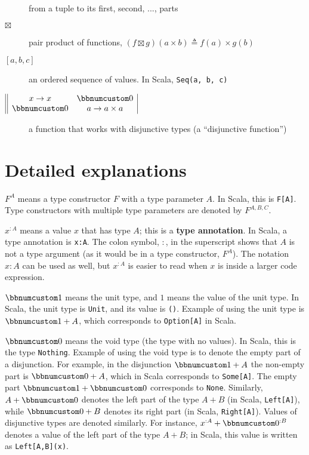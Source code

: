 \begin{description}
from a tuple to its first, second, ..., parts
\item [{$\boxtimes$}] pair product of functions, $(f\boxtimes g)(a\times b)\triangleq f(a)\times g(b)$
\item [{$\left[a,b,c\right]$}] an ordered sequence of values. In Scala,
\lstinline!Seq(a, b, c)!
\item [{$\begin{array}{||cc|}
x\rightarrow x & \bbnum 0\\
\bbnum 0 & a\rightarrow a\times a
\end{array}$}] a function that works with disjunctive types (a \textsf{``}disjunctive
function\textsf{''})
\end{description}

\section{Detailed explanations}

$F^{A}$ means a type constructor $F$ with a type parameter $A$.
In Scala, this is \lstinline!F[A]!. Type constructors with multiple
type parameters are denoted by $F^{A,B,C}$.

$x^{:A}$ means a value $x$ that has type $A$; this is a \textbf{type
annotation}. In Scala, a type annotation is \lstinline!x:A!. The
colon symbol, $:$, in the superscript shows that $A$ is not a type
argument (as it would be in a type constructor, $F^{A}$). The notation
$x:A$ can be used as well, but $x^{:A}$ is easier to read when $x$
is inside a larger code expression. 

$\bbnum 1$ means the unit type, and $1$ means
the value of the unit type. In Scala, the unit type is \lstinline!Unit!,
and its value is \lstinline!()!. Example of using the unit type is
$\bbnum 1+A$, which corresponds to \lstinline!Option[A]! in Scala.

$\bbnum 0$ means the void type (the type with no
values). In Scala, this is the type \lstinline!Nothing!. Example
of using the void type is to denote the empty part of a disjunction.
For example, in the disjunction $\bbnum 1+A$ the non-empty part is
$\bbnum 0+A$, which in Scala corresponds to \lstinline!Some[A]!.
The empty part $\bbnum 1+\bbnum 0$ corresponds to \lstinline!None!.
Similarly, $A+\bbnum 0$ denotes the left part of the type $A+B$
(in Scala, \lstinline!Left[A]!), while $\bbnum 0+B$ denotes its
right part (in Scala, \lstinline!Right[A]!). Values of disjunctive
types are denoted similarly. For instance, $x^{:A}+\bbnum 0^{:B}$
denotes a value of the left part of the type $A+B$; in Scala, this
value is written as \lstinline!Left[A,B](x)!.

